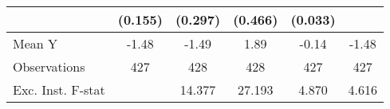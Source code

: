 {\begin{tabular}{l*{5}{c}}
            &     (0.155)         &     (0.297)         &     (0.466)         &     (0.033)         &                     \\
\midrule
Mean Y      &       -1.48         &       -1.49         &        1.89         &       -0.14         &       -1.48         \\
Observations&         427         &         428         &         428         &         427         &         427         \\
Exc. Inst. F-stat&                     &      14.377         &      27.193         &       4.870         &       4.616         \\
\bottomrule
\end{tabular}
}
